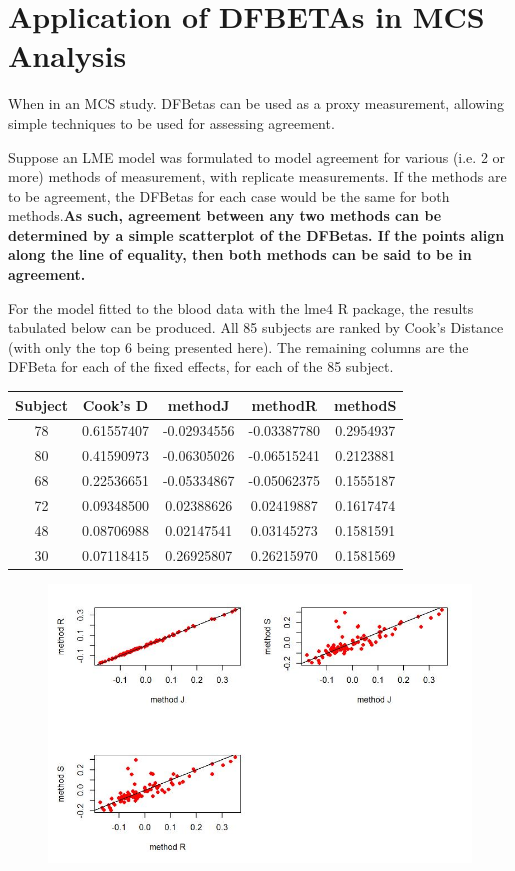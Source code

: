 \documentclass[12pt, a4paper]{report}
\theoremstyle{plain}
\theoremstyle{definition}
\theoremstyle{remark}
\begin{document}
\section{Application of DFBETAs in MCS Analysis}

When in an MCS study. DFBetas can be used as a proxy measurement, allowing simple techniques to be used for assessing agreement.

Suppose an LME model was formulated to model agreement for various (i.e. 2 or more) methods of measurement, with replicate measurements. If the methods are to be agreement, the DFBetas for each case would be the same for both methods.\textbf{As such, agreement between any two methods can be determined by a simple scatterplot of the DFBetas. If the points align along the line of equality, then both methods can be said to be in agreement.}

For the model fitted to the blood data with the lme4 R package, the results tabulated below can be produced. All 85 subjects are ranked by Cook's Distance (with only the top 6 being presented here). The remaining columns are the DFBeta for each of the fixed effects, for each of the 85 subject.
\begin{center}
	\begin{tabular}{|c|c|c|c|c|} \hline
		Subject &    Cook's D  &    methodJ  &   methodR  & methodS \\ \hline \hline
		78 & 0.61557407 & -0.02934556 & -0.03387780 & 0.2954937  \\ \hline
		80 & 0.41590973 & -0.06305026 & -0.06515241 & 0.2123881  \\ \hline
		68 & 0.22536651 & -0.05334867 & -0.05062375 & 0.1555187  \\ \hline
		72 & 0.09348500  & 0.02388626  & 0.02419887 & 0.1617474  \\ \hline
		48 & 0.08706988  & 0.02147541  & 0.03145273 & 0.1581591  \\ \hline
		30 & 0.07118415  & 0.26925807  & 0.26215970 & 0.1581569  \\ \hline
	\end{tabular} 
\end{center}
\newpage
\begin{figure}[h!]
	\centering
	\includegraphics[width=0.9\linewidth]{images/04-DFbetaplots}
\end{figure}
\end{document}
